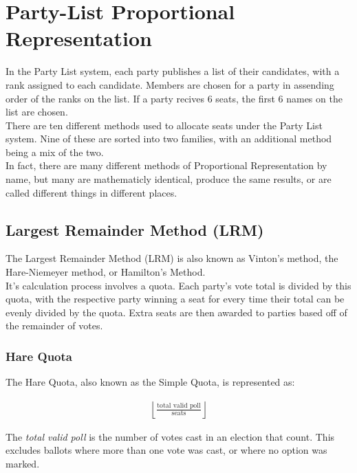 \documentclass{article}
\begin{document}
    \section{Party-List Proportional Representation}

    In the Party List system, each party publishes a list of their candidates, with a rank assigned to each candidate. Members are chosen for a party in assending order of the ranks on the list. If a party recives 6 seats, the first 6 names on the list are chosen.\\

    There are ten different methods used to allocate seats under the Party List system. Nine of these are sorted into two families, with an additional method being a mix of the two.\\

    In fact, there are many different methods of Proportional Representation by name, but many are mathematicly identical, produce the same results, or are called different things in different places.\\

    \subsection{Largest Remainder Method (LRM)}

    The Largest Remainder Method (LRM) is also known as Vinton's method, the Hare-Niemeyer method, or Hamilton's Method.\\

    It's calculation process involves a quota. Each party's vote total is divided by this quota, with the respective party winning a seat for every time their total can be evenly divided by the quota. Extra seats are then awarded to parties based off of the remainder of votes.\\

    \subsubsection{Hare Quota}

    The Hare Quota, also known as the Simple Quota, is represented as:

    \begin{align}
        \left \lfloor \frac{\text{total valid poll}}{\text{seats}} \right \rfloor
    \end{align}

    The \textit{total valid poll} is the number of votes cast in an election that count. This excludes ballots where more than one vote was cast, or where no option was marked.\\
\end{document}
